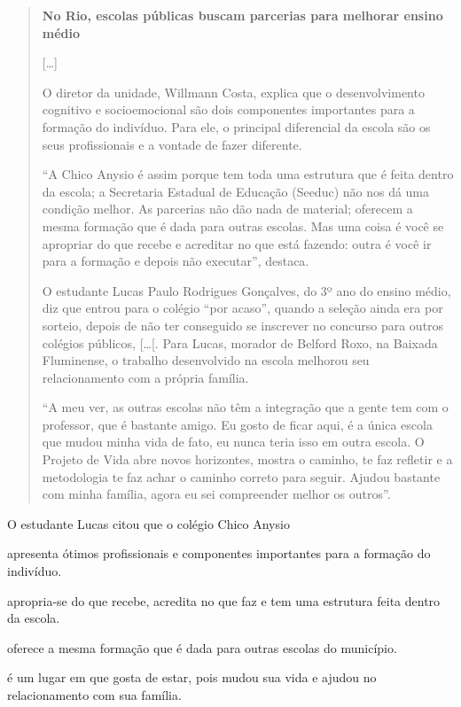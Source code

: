 \begin{quote}
\textbf{No Rio, escolas públicas buscam parcerias para melhorar ensino médio}

{[}\ldots{}{]}

O diretor da unidade, Willmann Costa, explica que o desenvolvimento
cognitivo e socioemocional são dois componentes importantes para a
formação do indivíduo. Para ele, o principal diferencial da escola são
os seus profissionais e a vontade de fazer diferente.

``A Chico Anysio é assim porque tem toda uma estrutura que é feita
dentro da escola; a Secretaria Estadual de Educação (Seeduc) não nos dá
uma condição melhor. As parcerias não dão nada de material; oferecem a
mesma formação que é dada para outras escolas. Mas uma coisa é você se
apropriar do que recebe e acreditar no que está fazendo: outra é você ir
para a formação e depois não executar'', destaca.

O estudante Lucas Paulo Rodrigues Gonçalves, do 3º ano do ensino médio,
diz que entrou para o colégio ``por acaso'', quando a seleção ainda era
por sorteio, depois de não ter conseguido se inscrever no concurso para
outros colégios públicos, {[}\ldots{}{[}. Para Lucas, morador de Belford
Roxo, na Baixada Fluminense, o trabalho desenvolvido na escola melhorou
seu relacionamento com a própria família.

``A meu ver, as outras escolas não têm a integração que a gente tem com
o professor, que é bastante amigo. Eu gosto de ficar aqui, é a única
escola que mudou minha vida de fato, eu nunca teria isso em outra
escola. O Projeto de Vida abre novos horizontes, mostra o caminho, te
faz refletir e a metodologia te faz achar o caminho correto para seguir.
Ajudou bastante com minha família, agora eu sei compreender melhor os
outros''.

\end{quote}

O estudante Lucas citou que o colégio Chico Anysio

\begin{escolha}
\item apresenta ótimos profissionais e componentes importantes para a
formação do indivíduo.

\item apropria-se do que recebe, acredita no que faz e tem uma estrutura
feita dentro da escola.

\item oferece a mesma formação que é dada para outras escolas do
município.

\item é um lugar em que gosta de estar, pois mudou sua vida e ajudou no
relacionamento com sua família.
\end{escolha}


